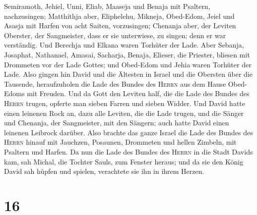 Semiramoth, Jehiel, Unni, Eliab, Maaseja und Benaja mit Psaltern,
nachzusingen;  Matthithja aber, Eliphelehu, Mikneja,
Obed-Edom, Jeiel und Asasja mit Harfen von acht Saiten, vorzusingen;
 Chenanja aber, der Leviten Oberster, der Sangmeister,
dass er sie unterwiese, zu singen; denn er war verständig.
 Und Berechja und Elkana waren Torhüter der Lade.
 Aber Sebanja, Josaphat, Nathanael, Amasai, Sacharja,
Benaja, Elieser, die Priester, bliesen mit Drommeten vor der Lade
Gottes; und Obed-Edom und Jehia waren Torhüter der Lade. 
Also gingen hin David und die Ältesten in Israel und die Obersten über
die Tausende, heraufzuholen die Lade des Bundes des \textsc{Herrn} aus
dem Hause Obed-Edoms mit Freuden.  Und da Gott den
Leviten half, die die Lade des Bundes des \textsc{Herrn} trugen, opferte
man sieben Farren und sieben Widder.  Und David hatte
einen leinenen Rock an, dazu alle Leviten, die die Lade trugen, und die
Sänger und Chenanja, der Sangmeister, mit den Sängern; auch hatte David
einen leinenen Leibrock darüber.  Also brachte das ganze
Israel die Lade des Bundes des \textsc{Herrn} hinauf mit Jauchzen,
Posaunen, Drommeten und hellen Zimbeln, mit Psaltern und Harfen.
 Da nun die Lade des Bundes des \textsc{Herrn} in die
Stadt Davids kam, sah Michal, die Tochter Sauls, zum Fenster heraus; und
da sie den König David sah hüpfen und spielen, verachtete sie ihn in
ihrem Herzen.

\hypertarget{section-15}{%
\section{16}\label{section-15}}

